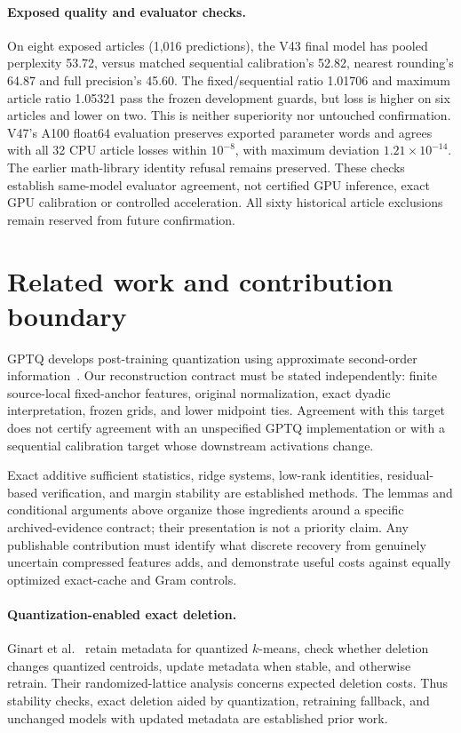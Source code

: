 \documentclass[10pt,twocolumn,letterpaper]{article}
\begin{document}
\paragraph{Exposed quality and evaluator checks.}
On eight exposed articles (1,016 predictions), the V43 final model has pooled
perplexity 53.72, versus matched sequential calibration's 52.82, nearest rounding's
64.87 and full precision's 45.60. The fixed/sequential ratio 1.01706 and maximum
article ratio 1.05321 pass the frozen development guards, but loss is higher on
six articles and lower on two. This is neither superiority nor untouched
confirmation. V47's A100 float64 evaluation preserves exported parameter words
and agrees with all 32 CPU article losses within $10^{-8}$, with maximum deviation
$1.21\times10^{-14}$. The earlier math-library identity refusal remains preserved.
These checks establish same-model evaluator agreement, not certified GPU inference,
exact GPU calibration or controlled acceleration. All sixty historical article
exclusions remain reserved from future confirmation.

\section{Related work and contribution boundary}
GPTQ develops post-training quantization using approximate second-order
information~\cite{gptq}. Our reconstruction contract must be stated independently:
finite source-local fixed-anchor features, original normalization, exact dyadic
interpretation, frozen grids, and lower midpoint ties. Agreement with this target
does not certify agreement with an unspecified GPTQ implementation or with a
sequential calibration target whose downstream activations change.

Exact additive sufficient statistics, ridge systems, low-rank identities,
residual-based verification, and margin stability are established methods. The
lemmas and conditional arguments above organize those ingredients around a
specific archived-evidence contract; their presentation is not a priority claim.
Any publishable contribution must identify what discrete recovery from genuinely
uncertain compressed features adds, and demonstrate useful costs against equally
optimized exact-cache and Gram controls.

\paragraph{Quantization-enabled exact deletion.}
Ginart et al.~\cite{ginart} retain metadata for quantized $k$-means, check whether
deletion changes quantized centroids, update metadata when stable, and otherwise
retrain. Their randomized-lattice analysis concerns expected deletion costs.
Thus stability checks, exact deletion aided by quantization, retraining fallback,
and unchanged models with updated metadata are established prior work.
\end{document}
